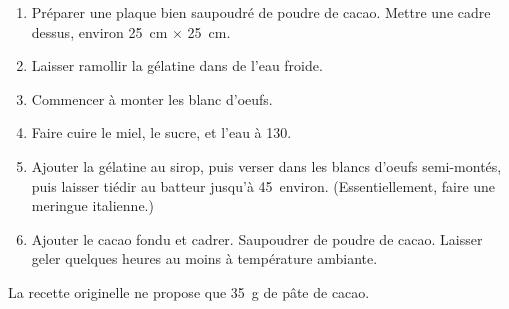 
\begin{ingredients}
\end{ingredients}


\begin{recipe}
  \begin{enumerate}

  \item Préparer une plaque bien saupoudré de poudre de cacao. Mettre
    une cadre dessus, environ 25~cm$\,\times\,$25~cm.

  \item Laisser ramollir la gélatine dans de l'eau froide.

  \item Commencer à monter les blanc d'oeufs.

  \item Faire cuire le miel, le sucre, et l'eau à 130\C.

  \item Ajouter la gélatine au sirop, puis verser dans les blancs
    d'oeufs semi-montés, puis laisser tiédir au batteur jusqu'à 45\C\,
    environ. (Essentiellement, faire une meringue italienne.)

  \item Ajouter le cacao fondu et cadrer. Saupoudrer de poudre de
    cacao. Laisser geler quelques heures au moins à température
    ambiante.

  \end{enumerate}
\end{recipe}

La recette originelle ne propose que 35~g de pâte de cacao.

